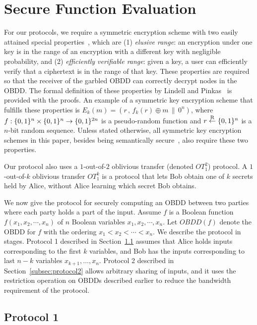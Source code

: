 \section{Secure Function Evaluation}
\label{sec:sfe-obdd}



For our protocols, we require a symmetric encryption scheme with two
easily attained special properties~\cite{LP04}, which are {\sf (1)} {\it elusive
range}: an encryption under one key is in the range of an encryption
with a different key with negligible probability, and {\sf (2)} {\it efficiently
verifiable range}: given a key, a user can efficiently verify that a
ciphertext is in the range of that key. These properties are required
so that the receiver of the garbled OBDD can correctly decrypt
nodes in the OBDD. The formal definition of these properties by
Lindell and Pinkas~\cite{LP04} is provided with the proofs. An example
of a symmetric key encryption scheme that fulfills these properties is
$E_k(m)=(r\,,\,f_k(r)\oplus m\,\|\,0^n)$, where
$f:\{0,1\}^n\times\{0,1\}^n\rightarrow\{0,1\}^{2n}$ is a pseudo-random
function and $r\stackrel{\mathrm{R}}{\gets}\{0,1\}^n$ is a $n$-bit random sequence. Unless
stated otherwise, all symmetric key encryption schemes in this paper,
besides being semantically secure~\cite[Chapter 5]{Goldreich:vol2},
also require these two properties.

Our protocol also uses a $1$-out-of-$2$
oblivious transfer (denoted $OT^2_1$) protocol. A $1$-out-of-$k$ oblivious transfer
$OT^k_1$ is a protocol that lets Bob obtain one of $k$ secrets held
by Alice, without Alice learning which secret Bob obtains.


We now give the protocol for securely computing an OBDD between two
parties where each party holds a part of the input. Assume $f$ is a
Boolean function $f(x_1,x_2,\cdots,x_n)$ of $n$ Boolean variables
$x_1,x_2,\cdots,x_n$. Let $OBDD(f)$ denote the OBDD for $f$ with the
ordering $x_1 < x_2 < \cdots < x_n$. We describe the protocol in stages.
Protocol 1 described in Section~\ref{sec:basicprotocol} assumes that
Alice holds inputs corresponding to the first $k$ variables, and 
Bob has the inputs corresponding to last $n-k$ variables
$x_{k+1},\ldots,x_n$. Protocol 2 described in Section~\ref{subsec:protocol2}
allows arbitrary sharing of inputs, and it uses the restriction
operation on OBDDs described earlier to reduce the bandwidth requirement
of the protocol.

\subsection{Protocol 1}
\label{sec:basicprotocol}


